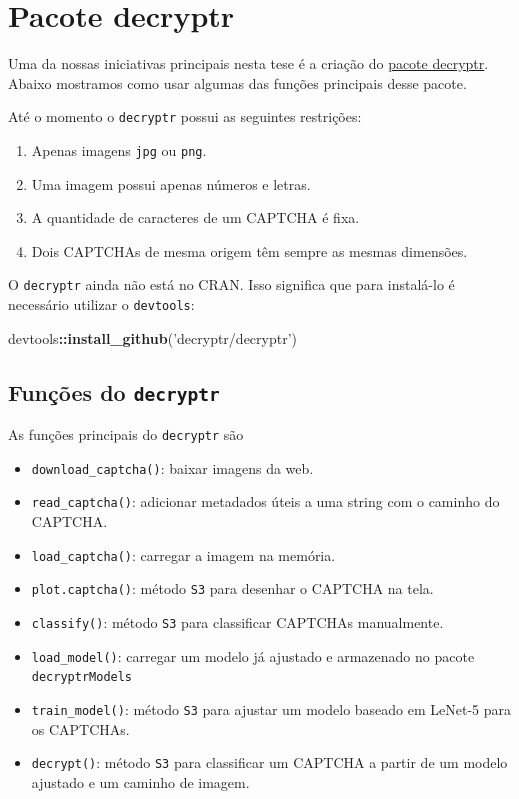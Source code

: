 \documentclass[12pt,]{report}
\newenvironment{Shaded}{\begin{snugshade}}{\end{snugshade}}
\newcommand{\KeywordTok}[1]{\textcolor[rgb]{0.13,0.29,0.53}{\textbf{#1}}}
\newcommand{\StringTok}[1]{\textcolor[rgb]{0.31,0.60,0.02}{#1}}
\newcommand{\OperatorTok}[1]{\textcolor[rgb]{0.81,0.36,0.00}{\textbf{#1}}}
\newcommand{\NormalTok}[1]{#1}
\providecommand{\tightlist}{%
  \setlength{\itemsep}{0pt}\setlength{\parskip}{0pt}}
\begin{document}
\chapter{Pacote decryptr}\label{pacote-decryptr}

Uma da nossas iniciativas principais nesta tese é a criação do
\href{https://github.com/decryptr/decryptr}{pacote decryptr}. Abaixo
mostramos como usar algumas das funções principais desse pacote.

Até o momento o \texttt{decryptr} possui as seguintes restrições:

\begin{enumerate}
\def\labelenumi{\arabic{enumi}.}
\tightlist
\item
  Apenas imagens \texttt{jpg} ou \texttt{png}.
\item
  Uma imagem possui apenas números e letras.
\item
  A quantidade de caracteres de um CAPTCHA é fixa.
\item
  Dois CAPTCHAs de mesma origem têm sempre as mesmas dimensões.
\end{enumerate}

O \texttt{decryptr} ainda não está no CRAN. Isso significa que para
instalá-lo é necessário utilizar o \texttt{devtools}:

\begin{Shaded}
\begin{Highlighting}[]
\NormalTok{devtools}\OperatorTok{::}\KeywordTok{install_github}\NormalTok{(}\StringTok{'decryptr/decryptr'}\NormalTok{)}
\end{Highlighting}
\end{Shaded}

\section{\texorpdfstring{Funções do
\texttt{decryptr}}{Funções do decryptr}}\label{funcoes-do-decryptr}

As funções principais do \texttt{decryptr} são

\begin{itemize}
\tightlist
\item
  \texttt{download\_captcha()}: baixar imagens da web.
\item
  \texttt{read\_captcha()}: adicionar metadados úteis a uma string com o
  caminho do CAPTCHA.
\item
  \texttt{load\_captcha()}: carregar a imagem na memória.
\item
  \texttt{plot.captcha()}: método \texttt{S3} para desenhar o CAPTCHA na
  tela.
\item
  \texttt{classify()}: método \texttt{S3} para classificar CAPTCHAs
  manualmente.
\item
  \texttt{load\_model()}: carregar um modelo já ajustado e armazenado no
  pacote \texttt{decryptrModels}
\item
  \texttt{train\_model()}: método \texttt{S3} para ajustar um modelo
  baseado em LeNet-5 para os CAPTCHAs.
\item
  \texttt{decrypt()}: método \texttt{S3} para classificar um CAPTCHA a
  partir de um modelo ajustado e um caminho de imagem.
\end{itemize}
\end{document}
